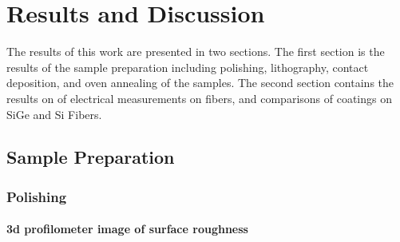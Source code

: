 \chapter{Results and Discussion}
The results of this work are presented in two sections. The first section is the results of the sample preparation including polishing, lithography, contact deposition, and oven annealing of the samples. The second section contains the results on of electrical measurements on fibers, and comparisons of coatings on SiGe and Si Fibers.

\section{Sample Preparation}

\subsection{Polishing}

\subsubsection{3d profilometer image of surface roughness}


